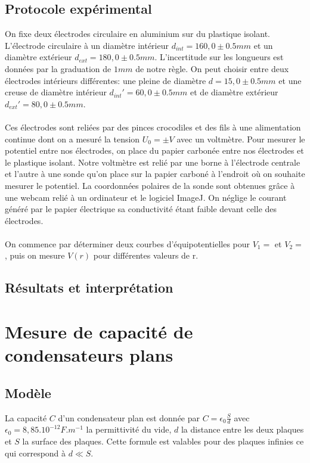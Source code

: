\documentclass[12pt]{article}
\begin{document}
	\subsection{Protocole expérimental}
	
	On fixe deux électrodes circulaire en aluminium sur du plastique isolant. L'électrode circulaire à un diamètre intérieur $d_{int}=160,0\pm 0.5 mm$ et un diamètre extérieur $d_{ext}=180,0\pm 0.5 mm$. L'incertitude sur les longueurs est données par la graduation de $1mm$ de notre règle. On peut choisir entre deux électrodes intérieurs différentes: une pleine de diamètre $d=15,0\pm 0.5 mm$ et une creuse de diamètre intérieur $d_{int}'=60,0\pm 0.5 mm$ et de diamètre extérieur $d_{ext}'=80,0\pm 0.5 mm$. \\ \\ 
	Ces électrodes sont reliées par des pinces crocodiles et des fils à une alimentation continue dont on a mesuré la tension $U_0= \pm V$ avec un  voltmètre. Pour mesurer le potentiel entre nos électrodes, on place du papier carbonée entre nos électrodes et le plastique isolant. Notre voltmètre est relié par une borne à l'électrode centrale et l'autre à une sonde qu'on place sur la papier carboné à l'endroit où on souhaite mesurer le potentiel. La coordonnées polaires de la sonde sont obtenues grâce à une webcam relié à un ordinateur et le logiciel ImageJ. On néglige le courant généré par le papier électrique sa conductivité étant faible devant celle des électrodes. \\ \\
	On commence par déterminer deux courbes d'équipotentielles pour $V_1=$ et $V_2=$, puis on mesure $V(r)$ pour différentes valeurs de r.  
	
	\subsection{Résultats et interprétation}
	
	
\section{Mesure de capacité de condensateurs plans}
	\subsection{Modèle}
La capacité $C$ d'un condensateur plan est donnée par $C=\epsilon_0\frac{S}{d}$ avec $\epsilon_0=8,85.10^{-12} F.m^{-1}$ la permittivité du vide, $d$ la distance entre les deux plaques et $S$ la surface des plaques. Cette formule est valables pour des plaques infinies ce qui correspond à $d\ll S$. \\
\end{document}
